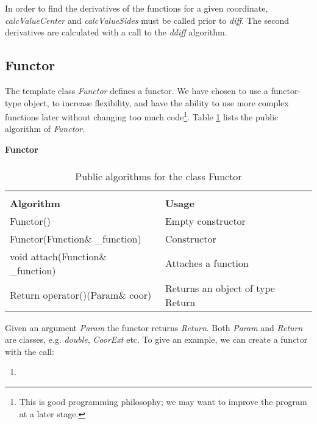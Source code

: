 In order to find the derivatives of the functions for a given
coordinate, \emph{calcValueCenter} and \emph{calcValueSides}
must be called prior to \emph{diff}. The second derivatives are
calculated with a call to the \emph{ddiff} algorithm.



\subsection{Functor}

The template class \emph{Functor} defines a functor. 
We have chosen to use a functor-type object, to increase
flexibility, and have the ability to use more complex functions
later without changing too much code\footnote{This is good programming
  philosophy; we may want to improve the program at a later stage.}.
Table \ref{Functor} lists the public algorithm of \emph{Functor}.

\begin{table}[hbtp]
\begin{center} {\large \bf Functor} \\ 
$\phantom{a}$ \\
\begin{tabular}{ll}
\hline\\ 
{\bf Algorithm}                   & {\bf Usage} \\
Functor()                         & Empty constructor\\
Functor(Function\& \_function)    & Constructor\\
void attach(Function\& \_function)& Attaches a function\\
Return operator()(Param\& coor)   & Returns an object of type Return\\
\hline
\end{tabular} 
 \end{center}
  \caption{Public algorithms for the class Functor}
\label{Functor}
\end{table}


Given an argument 
\emph{Param} the functor returns \emph{Return}. Both \emph{Param} and
\emph{Return} are classes, e.g. \emph{double}, \emph{CoorExt} etc.
To give an example, we can create a functor with the call:

{\footnotesize
\begin{enumerate}
\item[]
  
\end{enumerate}
}

